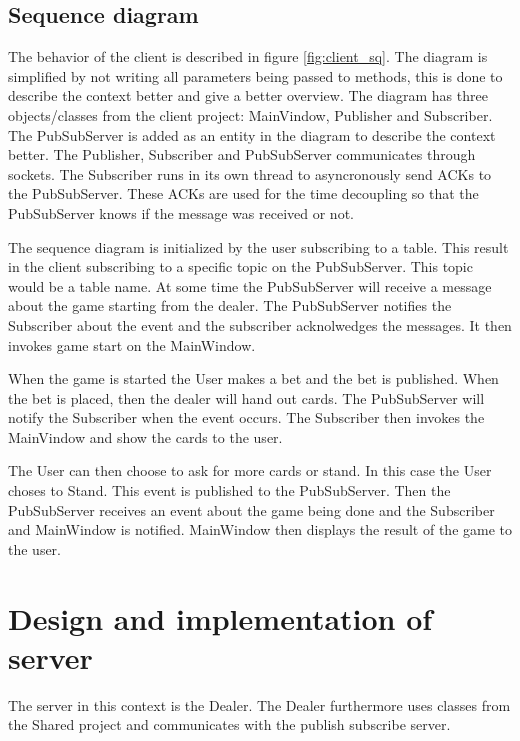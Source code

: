 \FloatBarrier

\subsection{Sequence diagram}
The behavior of the client is described in figure \ref{fig:client_sq}. The diagram is simplified by not writing all parameters being passed to methods, this is done to describe the context better and give a better overview. The diagram has three objects/classes from the client project: MainVindow, Publisher and Subscriber. The PubSubServer is added as an entity in the diagram to describe the context better. The Publisher, Subscriber and PubSubServer communicates through sockets. The Subscriber runs in its own thread to asyncronously send ACKs to the PubSubServer. These ACKs are used for the time decoupling so that the PubSubServer knows if the message was received or not.

The sequence diagram is initialized by the user subscribing to a table. This result in the client subscribing to a specific topic on the PubSubServer. This topic would be a table name. At some time the PubSubServer will receive a message about the game starting from the dealer. The PubSubServer notifies the Subscriber about the event and the subscriber acknolwedges the messages. It then invokes game start on the MainWindow. 

When the game is started the User makes a bet and the bet is published. When the bet is placed, then the dealer will hand out cards. The PubSubServer will notify the Subscriber when the event occurs. The Subscriber then invokes the MainVindow and show the cards to the user. 

The User can then choose to ask for more cards or stand. In this case the User choses to Stand. This event is published to the PubSubServer. Then the PubSubServer receives an event about the game being done and the Subscriber and MainWindow is notified. MainWindow then displays the result of the game to the user.

\FloatBarrier

\section{Design and implementation of server}
The server in this context is the Dealer. The Dealer furthermore uses classes from the Shared project and communicates with the publish subscribe server.

